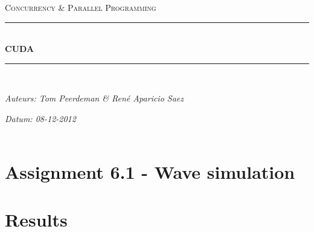 \documentclass[a4paper]{article}
\newcommand{\HRule}{\rule{\linewidth}{0.5mm}}
\begin{document}
	\begin{titlepage}
	\begin{center}
		\textsc{\Large Concurrency \& Parallel Programming}\\[0.5cm]
		\HRule \\[0,4cm]
		\textsc{\huge \bfseries CUDA}
		\HRule \\[8cm]
		\begin{minipage}{0.4\textwidth}
			\begin{flushleft}\large
				\emph{Auteurs: Tom Peerdeman \& Ren\'e Aparicio Saez}\\
			\end{flushleft}
		\end{minipage}
		\begin{minipage}{0.4\textwidth}
			\begin{flushright}\large
			\emph{Datum: 08-12-2012\\\hspace{1cm}}\\
			\end{flushright}
		\end{minipage}
	\end{center}
	\end{titlepage}

\section{Assignment 6.1 - Wave simulation}
  
	\section{Results}
		
\end{document}
